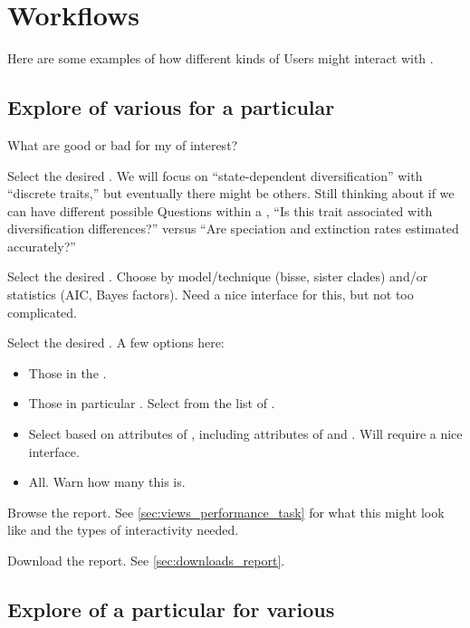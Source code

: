 \section{Workflows}

Here are some examples of how different kinds of Users might interact with \phycomb.

\subsection{Explore \Performance of various \Methods for a particular \Task}
\label{sec:workflows_task}

What \Methods are good or bad for my \Task of interest?

Select the desired \Task.
We will focus on ``state-dependent diversification'' with ``discrete traits,'' but eventually there might be others.
Still thinking about if we can have different possible Questions within a \Task, \eg ``Is this trait associated with diversification differences?'' versus ``Are speciation and extinction rates estimated accurately?''

Select the desired \Methods.
Choose by model/technique (\eg bisse, sister clades) and/or statistics (\eg AIC, Bayes factors).
Need a nice interface for this, but not too complicated.

Select the desired \Elements.
A few options here:
\begin{itemize}
    \item Those in the \Benchmark.
    \item Those in particular \Refsets.  Select from the list of \Refsets.
    \item Select based on attributes of \Elements, including attributes of \Trees and \Traits.  Will require a nice interface.
    \item All.  Warn how many this is.
\end{itemize}

Browse the \Performance report.
See \cref{sec:views_performance_task} for what this might look like and the types of interactivity needed.

Download the \Performance report.
See \cref{sec:downloads_report}.

\subsection{Explore \Performance of a particular \Method for various \Tasks}
\label{sec:workflows_method}

